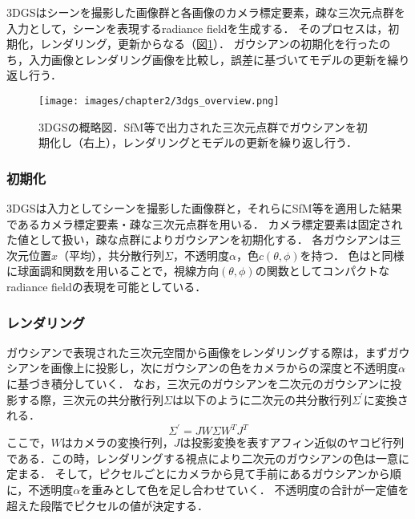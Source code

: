 3DGSはシーンを撮影した画像群と各画像のカメラ標定要素，疎な三次元点群を入力として，シーンを表現するradiance fieldを生成する．
そのプロセスは，初期化，レンダリング，更新からなる（図\ref{fig:3dgs_overview}）．
ガウシアンの初期化を行ったのち，入力画像とレンダリング画像を比較し，誤差に基づいてモデルの更新を繰り返し行う．
\begin{figure}[h]
  \centering
  \texttt{[image: images/chapter2/3dgs\_overview.png]}
  \caption[3DGSの概略図]{3DGSの概略図．SfM等で出力された三次元点群でガウシアンを初期化し（右上），レンダリングとモデルの更新を繰り返し行う．}
  \label{fig:3dgs_overview}
\end{figure}

\subsubsection*{初期化}
3DGSは入力としてシーンを撮影した画像群と，それらにSfM等を適用した結果であるカメラ標定要素・疎な三次元点群を用いる．
カメラ標定要素は固定された値として扱い，疎な点群によりガウシアンを初期化する．
各ガウシアンは三次元位置$x$（平均），共分散行列$\Sigma$，不透明度$\alpha$，色$c(\theta, \phi)$を持つ．
色は\cite{plenoxels}\cite{instant-ngp}と同様に球面調和関数を用いることで，視線方向$(\theta, \phi)$の関数としてコンパクトなradiance fieldの表現を可能としている．\par

\subsubsection*{レンダリング}
ガウシアンで表現された三次元空間から画像をレンダリングする際は，まずガウシアンを画像上に投影し，次にガウシアンの色をカメラからの深度と不透明度$\alpha$に基づき積分していく．
なお，三次元のガウシアンを二次元のガウシアンに投影する際，三次元の共分散行列$\Sigma$は以下のように二次元の共分散行列$\Sigma^{\prime}$に変換される．
\begin{equation}
  \Sigma^{\prime}=J W \Sigma W^T J^T
\end{equation}
ここで，$W$はカメラの変換行列，$J$は投影変換を表すアフィン近似のヤコビ行列である．この時，レンダリングする視点により二次元のガウシアンの色は一意に定まる．
そして，ピクセルごとにカメラから見て手前にあるガウシアンから順に，不透明度$\alpha$を重みとして色を足し合わせていく．
不透明度の合計が一定値を超えた段階でピクセルの値が決定する．\par

